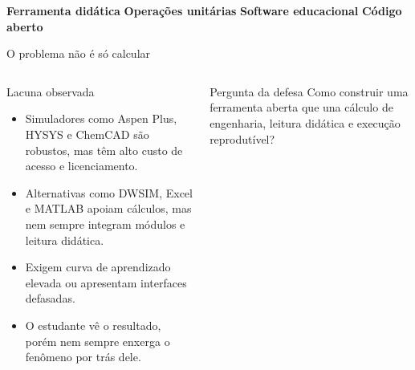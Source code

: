 \begin{frame}[plain]
  \begin{center}
    {\small\color{dcoublue}\textbf{Ferramenta didática}}
    \hspace{0.45em}\textcolor{dcouline}{\textbullet}\hspace{0.45em}
    {\small\color{dcoublue}\textbf{Operações unitárias}}
    \hspace{0.45em}\textcolor{dcouline}{\textbullet}\hspace{0.45em}
    {\small\color{dcoublue}\textbf{Software educacional}}
    \hspace{0.45em}\textcolor{dcouline}{\textbullet}\hspace{0.45em}
    {\small\color{dcoublue}\textbf{Código aberto}}
  \end{center}
\vfill
\end{frame}

\begin{frame}{O problema não é só calcular}
  \vspace*{-0.85em}
  \begin{columns}[T,onlytextwidth]
      \begin{block}{Lacuna observada}
        {\small
        \begin{itemize}
          \setlength{\itemsep}{0.25em}
          \item Simuladores como Aspen Plus, HYSYS e ChemCAD são robustos, mas têm alto custo de acesso e licenciamento.
          \item Alternativas como DWSIM, Excel e MATLAB apoiam cálculos, mas nem sempre integram módulos e leitura didática.
          \item Exigem curva de aprendizado elevada ou apresentam interfaces defasadas.
          \item O estudante vê o resultado, porém nem sempre enxerga o fenômeno por trás dele.
        \end{itemize}
        }
      \end{block}
      \begin{alertblock}{Pergunta da defesa}
        {\small Como construir uma ferramenta aberta que una cálculo de engenharia, leitura didática e execução reprodutível?}
      \end{alertblock}
  \end{columns}
\end{frame}

